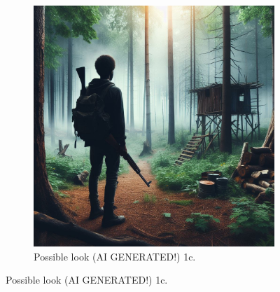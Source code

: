 \documentclass[a4paper,10pt,english]{article}
\begin{document}
\begin{figure}[h]
\begin{subfigure}{0.5\linewidth}
    \includegraphics[width=\linewidth]{otari_ai.jpg}
    \caption{Possible look (AI GENERATED!) 1c.}
    \label{Fig:Style1C}
\end{subfigure}

\end{figure}
\end{document}
